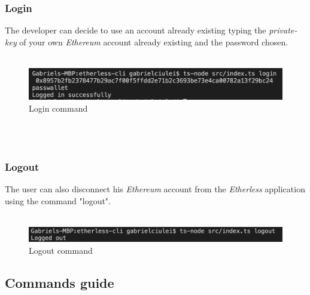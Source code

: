 \subsubsection{Login}
The developer can decide to use an account already existing typing the \textit{private-key\glos} of your own \textit{Ethereum\glos} account already existing and the password chosen.\\\\
\centerline{}
\begin{figure}[h]
	\begin{center}
	\includegraphics[width=\textwidth]{res/img/Screenshot_login.png}
	\caption{Login command}
	\end{center}
\end{figure}\\\\
\subsubsection{Logout}
The user can also disconnect his \textit{Ethereum\glo} account from the \textit{Etherless} application using the command "logout".\\\\
\centerline{}
\begin{figure}[h]
	\centering
	\includegraphics[width=\textwidth]{res/img/Screenshot_logout.png}
	\caption{Logout command}
\end{figure}
\subsection{Commands guide}
